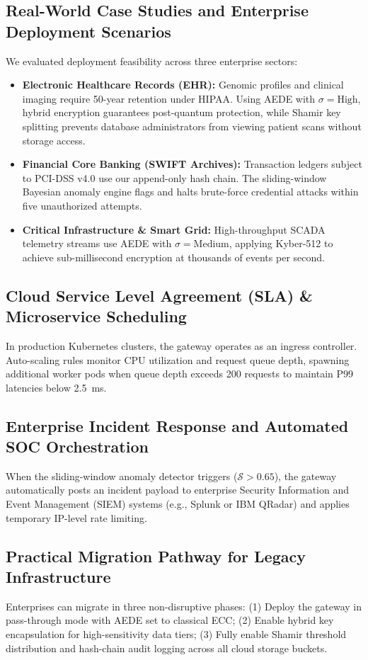 \documentclass[sn-mathphys,Numbered]{sn-jnl}%
\theoremstyle{thmstyleone}%
\theoremstyle{thmstyletwo}%
\theoremstyle{thmstylethree}%
\begin{document}
\subsection{\textbf{Real-World Case Studies and Enterprise Deployment Scenarios}}
We evaluated deployment feasibility across three enterprise sectors:
\begin{itemize}
    \item \textbf{Electronic Healthcare Records (EHR):} Genomic profiles and clinical imaging require 50-year retention under HIPAA. Using AEDE with $\sigma=\text{High}$, hybrid encryption guarantees post-quantum protection, while Shamir key splitting prevents database administrators from viewing patient scans without storage access.
    \item \textbf{Financial Core Banking (SWIFT Archives):} Transaction ledgers subject to PCI-DSS v4.0 use our append-only hash chain. The sliding-window Bayesian anomaly engine flags and halts brute-force credential attacks within five unauthorized attempts.
    \item \textbf{Critical Infrastructure \& Smart Grid:} High-throughput SCADA telemetry streams use AEDE with $\sigma=\text{Medium}$, applying Kyber-512 to achieve sub-millisecond encryption at thousands of events per second.
\end{itemize}

\subsection{\textbf{Cloud Service Level Agreement (SLA) \& Microservice Scheduling}}
In production Kubernetes clusters, the gateway operates as an ingress controller. Auto-scaling rules monitor CPU utilization and request queue depth, spawning additional worker pods when queue depth exceeds 200 requests to maintain P99 latencies below 2.5~ms.

\subsection{\textbf{Enterprise Incident Response and Automated SOC Orchestration}}
When the sliding-window anomaly detector triggers ($\mathcal{S} > 0.65$), the gateway automatically posts an incident payload to enterprise Security Information and Event Management (SIEM) systems (e.g., Splunk or IBM QRadar) and applies temporary IP-level rate limiting.

\subsection{\textbf{Practical Migration Pathway for Legacy Infrastructure}}
Enterprises can migrate in three non-disruptive phases: (1) Deploy the gateway in pass-through mode with AEDE set to classical ECC; (2) Enable hybrid key encapsulation for high-sensitivity data tiers; (3) Fully enable Shamir threshold distribution and hash-chain audit logging across all cloud storage buckets.
\end{document}
